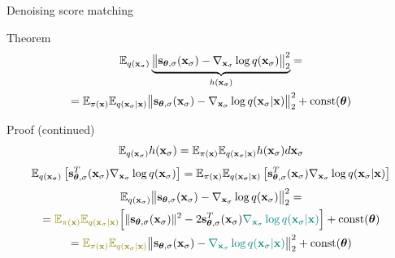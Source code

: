 \begin{frame}{Denoising score matching}
	\vspace{-0.3cm}
	\begin{block}{Theorem}
	\vspace{-0.7cm}
	\begin{multline*}
		\mathbb{E}_{q(\mathbf{x}_{\sigma})}\underbrace{\bigl\| \mathbf{s}_{\boldsymbol{\theta}, \sigma}(\mathbf{x}_{\sigma}) - \nabla_{\mathbf{x}_{\sigma}} \log q(\mathbf{x}_{\sigma}) \bigr\|^2_2}_{h(\mathbf{x}_{\sigma})} = \\
		= \mathbb{E}_{\pi(\mathbf{x})} \mathbb{E}_{q(\mathbf{x}_{\sigma} | \mathbf{x})}\bigl\| \mathbf{s}_{\boldsymbol{\theta}, \sigma}(\mathbf{x}_{\sigma}) - \nabla_{\mathbf{x}_{\sigma}} \log q(\mathbf{x}_{\sigma} | \mathbf{x}) \bigr\|^2_2 + \text{const}(\boldsymbol{\theta})
	\end{multline*}
	\vspace{-0.9cm}
	\end{block}
	\begin{block}{Proof (continued)}
		\vspace{-0.3cm}
		\[
			\mathbb{E}_{q(\mathbf{x}_{\sigma})} h(\mathbf{x}_{\sigma})=  \mathbb{E}_{\pi(\mathbf{x})} \mathbb{E}_{q(\mathbf{x}_{\sigma} | \mathbf{x})}  h(\mathbf{x}_{\sigma}) d\mathbf{x}_{\sigma}
		\]
		\[
			\mathbb{E}_{q(\mathbf{x}_{\sigma})} \left[\mathbf{s}_{\boldsymbol{\theta}, \sigma}^T(\mathbf{x}_{\sigma}) \nabla_{\mathbf{x}_{\sigma}} \log q(\mathbf{x}_{\sigma}) \right] = \mathbb{E}_{\pi(\mathbf{x})} \mathbb{E}_{q(\mathbf{x}_{\sigma} | \mathbf{x})} \left[\mathbf{s}_{\boldsymbol{\theta}, \sigma}^T(\mathbf{x}_{\sigma}) \nabla_{\mathbf{x}_{\sigma}} \log q(\mathbf{x}_{\sigma} | \mathbf{x}) \right]
		\]
		\vspace{-0.5cm}
		{\small
		\begin{multline*}
			\bbE_{q(\bx_{\sigma})}\bigl\| \bs_{\btheta, \sigma}(\bx_{\sigma}) - \nabla_{\bx_{\sigma}} \log q(\bx_{\sigma}) \bigr\|^2_2 = \\ 
			= {\color{olive}\bbE_{\pi(\bx)} \bbE_{q(\bx_{\sigma} | \bx)}}\Bigl[\| \bs_{\btheta, \sigma}(\bx_{\sigma}) \|^2 - 2 \bs_{\btheta, \sigma}^T(\bx_{\sigma}) {\color{teal}\nabla_{\bx_{\sigma}} \log q(\bx_{\sigma} | \bx)} \Bigr] + \text{const}(\btheta) \\
			= {\color{olive}\bbE_{\pi(\bx)} \bbE_{q(\bx_{\sigma} | \bx)}} \bigl\|\bs_{\btheta, \sigma}(\bx_{\sigma}) - {\color{teal}\nabla_{\bx_{\sigma}} \log q(\bx_{\sigma} | \bx)} \bigr\|_2^2 + \text{const}(\btheta)
		\end{multline*}
		}
		\vspace{-0.8cm}
	\end{block}
\end{frame}
